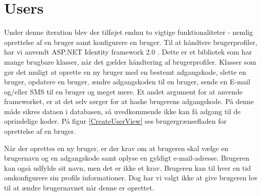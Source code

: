 \section{Users}

Under denne iteration blev der tilføjet endnu to vigtige funktionaliteter - nemlig oprettelse af en bruger samt konfigurere en bruger. Til at håndtere brugerprofiler, har vi anvendt ASP.NET Identity framework 2.0 \citep{msdnIdentityFrameworkWeb}. Dette er et bibliotek som har mange brugbare klasser, når det gælder håndtering af brugerprofiler. Klasser som gør det muligt at oprette en ny bruger med en bestemt adgangskode, slette en bruger, opdatere en bruger, ændre adgangskoden til en bruger, sende en E-mail og/eller SMS til en bruger og meget mere. Et andet argument for at anvende frameworket, er at det selv sørger for at hashe brugerens adgangskode. På denne måde sikres dataen i databasen, så uvedkommende ikke kan få adgang til de oprindelige koder.
På figur \ref{CreateUserView} ses brugergrænsefladen for oprettelse af en bruger.


Når der oprettes en ny bruger, er der krav om at brugeren skal vælge en brugernavn og en adgangskode samt oplyse en gyldigt e-mail-adresse. Brugeren kan også udfylde sit navn, men det er ikke et krav. Brugeren kan til hver en tid omkonfigurere sin profils informationer. Dog har vi valgt ikke at give brugeren lov til at ændre brugernavnet når denne er oprettet.
